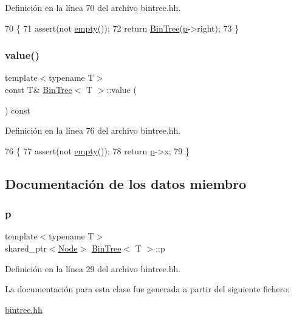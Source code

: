 Definición en la línea 70 del archivo bintree.\+hh.


\begin{DoxyCode}
70                            \{
71         assert(not \mbox{\hyperlink{class_bin_tree_a74cda259ba5c25b8ee38ed4dc33e4fad}{empty}}());
72         \textcolor{keywordflow}{return} \mbox{\hyperlink{class_bin_tree_a47eef22d29cd023449d97c073c08e5b6}{BinTree}}(\mbox{\hyperlink{class_bin_tree_afe3647af1dda90f6ddf1deee6560fcf1}{p}}->right);
73     \}
\end{DoxyCode}
\mbox{\label{class_bin_tree_a734e785b089c87b49187ee7c58edf5f3}} 
\subsubsection{\texorpdfstring{value()}{value()}}
{\footnotesize\ttfamily template$<$typename T$>$ \\
const T\& \mbox{\hyperlink{class_bin_tree}{Bin\+Tree}}$<$ T $>$\+::value (\begin{DoxyParamCaption}{ }\end{DoxyParamCaption}) const}



Definición en la línea 76 del archivo bintree.\+hh.


\begin{DoxyCode}
76                             \{
77         assert(not \mbox{\hyperlink{class_bin_tree_a74cda259ba5c25b8ee38ed4dc33e4fad}{empty}}());
78         \textcolor{keywordflow}{return} \mbox{\hyperlink{class_bin_tree_afe3647af1dda90f6ddf1deee6560fcf1}{p}}->x;
79     \}
\end{DoxyCode}


\subsection{Documentación de los datos miembro}
\mbox{\label{class_bin_tree_afe3647af1dda90f6ddf1deee6560fcf1}} 
\subsubsection{\texorpdfstring{p}{p}}
{\footnotesize\ttfamily template$<$typename T$>$ \\
shared\+\_\+ptr$<$\mbox{\hyperlink{struct_bin_tree_1_1_node}{Node}}$>$ \mbox{\hyperlink{class_bin_tree}{Bin\+Tree}}$<$ T $>$\+::p\hspace{0.3cm}{\ttfamily [private]}}



Definición en la línea 29 del archivo bintree.\+hh.



La documentación para esta clase fue generada a partir del siguiente fichero\+:\begin{DoxyCompactItemize}
\item 
\mbox{\hyperlink{bintree_8hh}{bintree.\+hh}}\end{DoxyCompactItemize}
